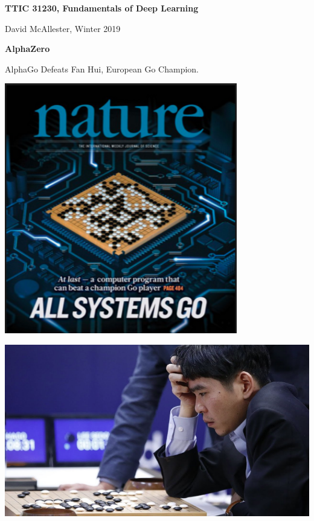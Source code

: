 




{\Huge

  \centerline{\bf TTIC 31230, Fundamentals of Deep Learning}
  \bigskip
  \centerline{David McAllester, Winter 2019}


\vfill
\centerline{\bf AlphaZero}
\vfill
\vfill


AlphaGo Defeats Fan Hui, European Go Champion.

\vfill
\centerline{\includegraphics[width=4in]{../images/alphago}}


\vfill
\centerline{\includegraphics[width=8in]{../images/alphagolee}}

}
